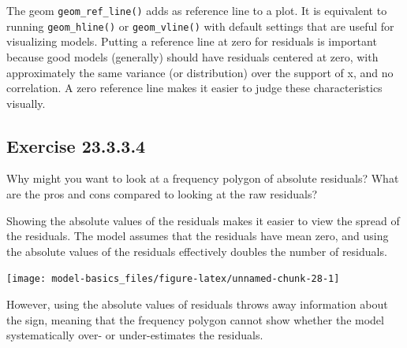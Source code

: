 \documentclass[]{book}
\newenvironment{Shaded}{\begin{snugshade}}{\end{snugshade}}
\newcommand{\DataTypeTok}[1]{\textcolor[rgb]{0.13,0.29,0.53}{#1}}
\newcommand{\FloatTok}[1]{\textcolor[rgb]{0.00,0.00,0.81}{#1}}
\newcommand{\KeywordTok}[1]{\textcolor[rgb]{0.13,0.29,0.53}{\textbf{#1}}}
\newcommand{\NormalTok}[1]{#1}
\newcommand{\OperatorTok}[1]{\textcolor[rgb]{0.81,0.36,0.00}{\textbf{#1}}}
\newcommand{\StringTok}[1]{\textcolor[rgb]{0.31,0.60,0.02}{#1}}
\theoremstyle{plain}
\theoremstyle{remark}
\begin{document}
The geom \texttt{geom\_ref\_line()} adds as reference line to a plot.
It is equivalent to running \texttt{geom\_hline()} or \texttt{geom\_vline()} with default settings that are useful for visualizing models.
Putting a reference line at zero for residuals is important because good models (generally) should have residuals centered at zero, with approximately the same variance (or distribution) over the support of x, and no correlation.
A zero reference line makes it easier to judge these characteristics visually.

\hypertarget{exercise-23.3.3.4}{%
\subsection*{\texorpdfstring{Exercise {23.3.3.4}}{Exercise 23.3.3.4}}\label{exercise-23.3.3.4}}

Why might you want to look at a frequency polygon of absolute residuals?
What are the pros and cons compared to looking at the raw residuals?

Showing the absolute values of the residuals makes it easier to view the spread of the residuals.
The model assumes that the residuals have mean zero, and using the absolute values of the residuals effectively doubles the number of residuals.

\begin{Shaded}
\end{Shaded}

\begin{center}\texttt{[image: model-basics\_files/figure-latex/unnamed-chunk-28-1]} \end{center}

However, using the absolute values of residuals throws away information about the sign, meaning that the
frequency polygon cannot show whether the model systematically over- or under-estimates the residuals.
\end{document}
